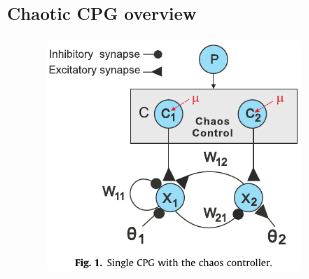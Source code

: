 \documentclass{beamer}
\begin{document}
\begin{frame}
\frametitle{Chaotic CPG overview}
\begin{figure}
\hspace*{-1cm}
\includegraphics[width=0.6\textwidth]{figs/CPG-overview.pdf}
\end{figure}
\end{frame}
\end{document}
